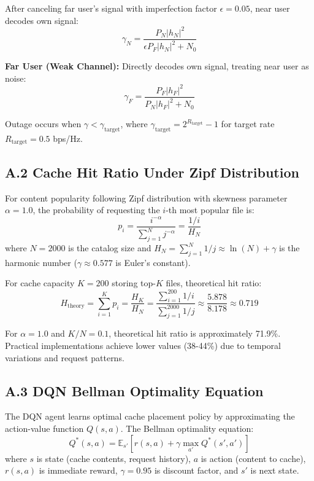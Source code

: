\documentclass[12pt,a4paper]{article}
\begin{document}
After canceling far user's signal with imperfection factor $\epsilon = 0.05$, near user decodes own signal:
\begin{equation}
\gamma_N = \frac{P_N |h_N|^2}{\epsilon P_F |h_N|^2 + N_0}
\end{equation}

\textbf{Far User (Weak Channel):} Directly decodes own signal, treating near user as noise:
\begin{equation}
\gamma_F = \frac{P_F |h_F|^2}{P_N |h_F|^2 + N_0}
\end{equation}

Outage occurs when $\gamma < \gamma_{\text{target}}$, where $\gamma_{\text{target}} = 2^{R_{\text{target}}} - 1$ for target rate $R_{\text{target}} = 0.5$ bps/Hz.

\subsection*{A.2 Cache Hit Ratio Under Zipf Distribution}

For content popularity following Zipf distribution with skewness parameter $\alpha = 1.0$, the probability of requesting the $i$-th most popular file is:
\begin{equation}
p_i = \frac{i^{-\alpha}}{\sum_{j=1}^{N} j^{-\alpha}} = \frac{1/i}{H_N}
\end{equation}
where $N = 2000$ is the catalog size and $H_N = \sum_{j=1}^{N} 1/j \approx \ln(N) + \gamma$ is the harmonic number ($\gamma \approx 0.577$ is Euler's constant).

For cache capacity $K = 200$ storing top-$K$ files, theoretical hit ratio:
\begin{equation}
H_{\text{theory}} = \sum_{i=1}^{K} p_i = \frac{H_K}{H_N} = \frac{\sum_{i=1}^{200} 1/i}{\sum_{j=1}^{2000} 1/j} \approx \frac{5.878}{8.178} \approx 0.719
\end{equation}

For $\alpha = 1.0$ and $K/N = 0.1$, theoretical hit ratio is approximately 71.9\%. Practical implementations achieve lower values (38-44\%) due to temporal variations and request patterns.

\subsection*{A.3 DQN Bellman Optimality Equation}

The DQN agent learns optimal cache placement policy by approximating the action-value function $Q(s, a)$. The Bellman optimality equation:
\begin{equation}
Q^*(s, a) = \mathbb{E}_{s'}\left[r(s, a) + \gamma \max_{a'} Q^*(s', a')\right]
\end{equation}
where $s$ is state (cache contents, request history), $a$ is action (content to cache), $r(s,a)$ is immediate reward, $\gamma = 0.95$ is discount factor, and $s'$ is next state.
\end{document}
